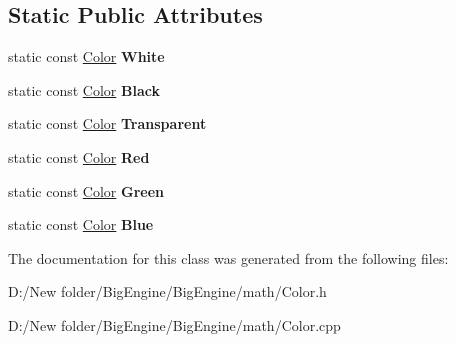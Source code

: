 \subsection*{Static Public Attributes}
\begin{DoxyCompactItemize}
\item 
\mbox{\label{class_big_1_1_color_a62b1b91d377fa2776c84adc9160f3ed1}} 
static const \mbox{\hyperlink{class_big_1_1_color}{Color}} {\bfseries White}
\item 
\mbox{\label{class_big_1_1_color_a9dfa9794cdeac598fb85830e73d7812c}} 
static const \mbox{\hyperlink{class_big_1_1_color}{Color}} {\bfseries Black}
\item 
\mbox{\label{class_big_1_1_color_aa65e159f5c4cc76bdd41655393f70ef3}} 
static const \mbox{\hyperlink{class_big_1_1_color}{Color}} {\bfseries Transparent}
\item 
\mbox{\label{class_big_1_1_color_a2cb65d51137713574ee658fbf74e6261}} 
static const \mbox{\hyperlink{class_big_1_1_color}{Color}} {\bfseries Red}
\item 
\mbox{\label{class_big_1_1_color_adc65fc7bb643e3f2a3e16c7017689c6c}} 
static const \mbox{\hyperlink{class_big_1_1_color}{Color}} {\bfseries Green}
\item 
\mbox{\label{class_big_1_1_color_af6db2c9824b21293e8c0c8a2d581107f}} 
static const \mbox{\hyperlink{class_big_1_1_color}{Color}} {\bfseries Blue}
\end{DoxyCompactItemize}


The documentation for this class was generated from the following files\+:\begin{DoxyCompactItemize}
\item 
D\+:/\+New folder/\+Big\+Engine/\+Big\+Engine/math/Color.\+h\item 
D\+:/\+New folder/\+Big\+Engine/\+Big\+Engine/math/Color.\+cpp\end{DoxyCompactItemize}
